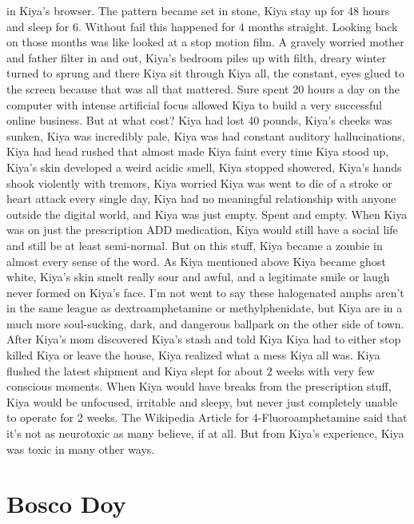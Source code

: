 \documentclass[12pt]{book}
\begin{document}
in Kiya's browser. The pattern became set in stone, Kiya stay up for 48 hours and sleep for 6. Without fail this happened for 4 months straight. Looking back on those months was like looked at a stop motion film. A gravely worried mother and father filter in and out, Kiya's bedroom piles up with filth, dreary winter turned to sprung and there Kiya sit through Kiya all, the constant, eyes glued to the screen because that was all that mattered. Sure spent 20 hours a day on the computer with intense artificial focus allowed Kiya to build a very successful online business. But at what cost? Kiya had lost 40 pounds, Kiya's cheeks was sunken, Kiya was incredibly pale, Kiya was had constant auditory hallucinations, Kiya had head rushed that almost made Kiya faint every time Kiya stood up, Kiya's skin developed a weird acidic smell, Kiya stopped showered, Kiya's hands shook violently with tremors, Kiya worried Kiya was went to die of a stroke or heart attack every single day, Kiya had no meaningful relationship with anyone outside the digital world, and Kiya was just empty. Spent and empty. When Kiya was on just the prescription ADD medication, Kiya would still have a social life and still be at least semi-normal. But on this stuff, Kiya became a zombie in almost every sense of the word. As Kiya mentioned above Kiya became ghost white, Kiya's skin smelt really sour and awful, and a legitimate smile or laugh never formed on Kiya's face. I'm not went to say these halogenated amphs aren't in the same league as dextroamphetamine or methylphenidate, but Kiya are in a much more soul-sucking, dark, and dangerous ballpark on the other side of town. After Kiya's mom discovered Kiya's stash and told Kiya Kiya had to either stop killed Kiya or leave the house, Kiya realized what a mess Kiya all was. Kiya flushed the latest shipment and Kiya slept for about 2 weeks with very few conscious moments. When Kiya would have breaks from the prescription stuff, Kiya would be unfocused, irritable and sleepy, but never just completely unable to operate for 2 weeks. The Wikipedia Article for 4-Fluoroamphetamine said that it's not as neurotoxic as many believe, if at all. But from Kiya's experience, Kiya was toxic in many other ways.



\chapter{Bosco Doy}
\end{document}

